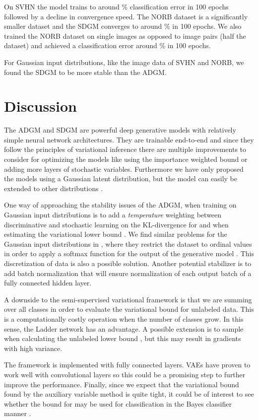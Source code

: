 \documentclass{article}
\begin{document}
On SVHN the model trains to around \% classification error in 100 epochs followed by a decline in convergence speed. The NORB dataset is a significantly smaller dataset and the SDGM converges to around \% in 100 epochs. We also trained the NORB dataset on single images as opposed to image pairs (half the dataset) and achieved a classification error around \% in 100 epochs.

For Gaussian input distributions, like the image data of SVHN and NORB, we found the SDGM to be more stable than the ADGM.

\section{Discussion}
The ADGM and SDGM are powerful deep generative models with relatively simple neural network architectures. They are trainable end-to-end and since they follow the principles of variational inference there are multiple improvements to consider for optimizing the models like using the importance weighted bound or adding more layers of stochastic variables. Furthermore we have only proposed the models using a Gaussian latent distribution, but the model can easily be extended to other distributions \citep{Ranganath2014, Ranganath2015}.

One way of approaching the stability issues of the ADGM, when training on Gaussian input distributions  is to add a \emph{temperature} weighting between discriminative and stochastic learning on the KL-divergence for  and  when estimating the variational lower bound \cite{Sonderby2016}. We find similar problems for the Gaussian input distributions in \citet{Oord2015}, where they restrict the dataset to ordinal values in order to apply a softmax function for the output of the generative model . This discretization of data is also a possible solution. Another potential stabilizer is to add batch normalization \cite{Ioffe2015} that will ensure normalization of each output batch of a fully connected hidden layer. 

A downside to the semi-supervised variational framework is that we are summing over all classes in order to evaluate the variational bound for unlabeled data. This is a computationally costly operation when the number of classes grow. In this sense, the Ladder network has an advantage. A possible extension is to sample  when calculating the unlabeled lower bound , but this may result in gradients with high variance.

The framework is implemented with fully connected layers. VAEs have proven to work well with convolutional layers so this could be a promising step to further improve the performance. Finally, since we expect that the variational bound found by the auxiliary variable method is quite tight, it could be of interest to see whether the bound for  may be used for classification in the Bayes classifier manner .
\vspace{-2mm}
\end{document}
